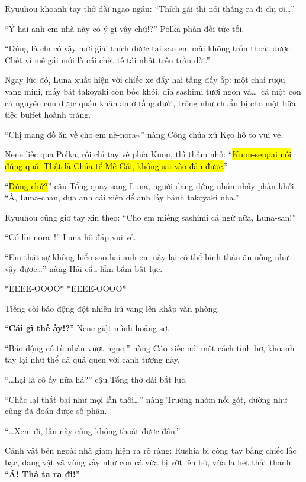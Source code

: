 \documentclass[../main.tex]{subfiles}
\begin{document}
Ryuuhou khoanh tay thở dài ngao ngán: ``Thích gái thì nói thẳng ra đi chị ơi\dots''

``Ý hai anh em nhà này có ý gì vậy chứ!?'' Polka phản đối tức tối.

``Đúng là chỉ có vậy mới giải thích được tại sao em mãi không trốn thoát được. Chết vì mê gái mới là cái chết tê tái nhât trên trần đời.''

Ngay lúc đó, Luna xuất hiện với chiếc xe đẩy hai tầng đầy ắp: một chai rượu vang mini, mấy bát takoyaki còn bốc khói, đĩa sashimi tươi ngon và\dots\ cả một con cá nguyên con được quấn khăn ăn ở tầng dưới, trông như chuẩn bị cho một bữa tiệc buffet hoành tráng.


``Chị mang đồ ăn về cho em nè-nora\~{}'' nàng Công chúa xứ Kẹo hô to vui vẻ.

Nene liếc qua Polka, rồi chỉ tay về phía Kuon, thì thầm nhỏ: ``\hl{Kuon-senpai nói đúng quá. Thật là Chúa tể Mê Gái, không sai vào đâu được.}''

``\hl{Đúng chứ?}'' cậu Tổng quay sang Luna, người đang đứng nhún nhảy phấn khởi. ``À, Luna-chan, đưa anh cái xiên để anh lấy bánh takoyaki nha.''

Ryuuhou cũng giơ tay xin theo: ``Cho em miếng sashimi cá ngừ nữa, Luna-san!''

``Có lìn-nora~{}!'' Luna hô đáp vui vẻ.

``Em thật sự không hiểu sao hai anh em này lại có thể bình thản ăn uống như vậy được\dots'' nàng Hải cẩu lẩm bẩm bất lực.

*EEEE-OOOO* *EEEE-OOOO*

Tiếng còi báo động đột nhiên hú vang lên khắp văn phòng.

``\textbf{Cái gì thế ấy!?}'' Nene giật mình hoảng sợ.

``Báo động có tù nhân vượt ngục,'' nàng Cáo xiếc nói một cách tỉnh bơ, khoanh tay lại như thể đã quá quen với cảnh tượng này.

``\dots Lại là cô ấy nữa hả?'' cậu Tổng thở dài bất lực.

``Chắc lại thất bại như mọi lần thôi\dots'' nàng Trưởng nhóm nối gót, dường như cũng đã đoán được số phận.

``\dots Xem đi, lần này cũng không thoát được đâu.''

Cảnh vật bên ngoài nhà giam hiện ra rõ ràng: Rushia bị còng tay bằng chiếc lắc bạc, đang vật vã vùng vẫy như con cá vừa bị vớt lên bờ, vừa la hét thất thanh: ``\textbf{Á! Thả ta ra đi!}''
\end{document}

